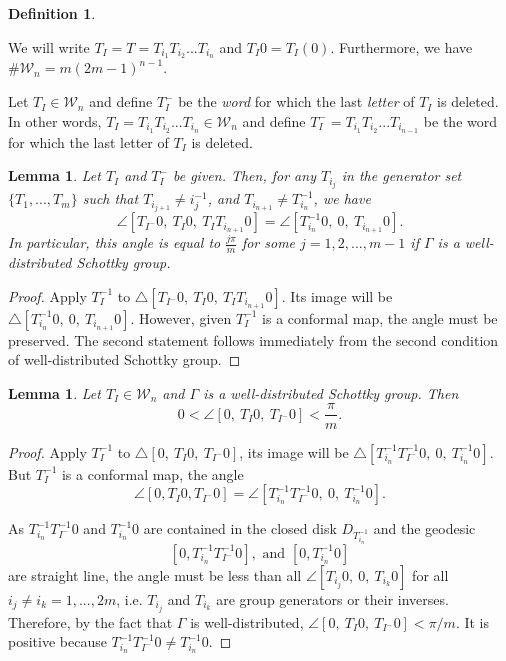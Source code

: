\documentclass[12pt,oneside]{sfsuthesis}
\theoremstyle{plain} %
\newtheorem{lemma}[theorem]{Lemma}
\theoremstyle{definition}  %
\newtheorem{definition}{Definition}[chapter]
\theoremstyle{remark}  %
\theoremstyle{plain}
\begin{document}
{\begin{definition}
\end{definition}



We will write $T_I =  T = T_{i_1}T_{i_2}...T_{i_n}$ and $T_I 0  = T_I(0)$. Furthermore, we have $\#{\mathcal W}_n = m  (2m-1)^{n-1}$.




Let $T_I\in{\mathcal W}_n$ and define $T_I^{-}$  be the \textit{word} for which the last \textit{letter} of $T_I$ is deleted. In other words, $T_I=T_{i_1}T_{i_2}...T_{i_n}\in{\mathcal W}_n$ and define $T_I^{-}=T_{i_1}T_{i_2}...T_{i_{n-1}}$ be the word for which the last letter of $T_I$ is deleted.



\begin{lemma}\label{lemma1}
Let $T_I$ and $T_I^{-}$ be given. Then, for any $T_{i_j}$ in the generator set $\{T_1,...,T_m\}$ such that $T_{i_{j+1}}\ne i_{j}^{-1}$, and $T_{i_{n+1}}\neq T_{i_{n}}^{-1}$, we have
$$
\angle  [T_{I^{-}}0, \ T_I0, \ T_{I}T_{i_{n+1}}0] = \angle [T_{i_{n}}^{-1}0, \ 0, \ T_{i_{n+1}}0]. 
$$
In particular, this angle is equal to $\frac{j\pi}{m}$ for some $j =  1,2,...,m-1$ if $\Gamma$ is a well-distributed Schottky group. 
\end{lemma}

\begin{proof}
Apply $T_{I}^{-1}$ to $\bigtriangleup [T_{I^{-}}0, \ T_I0, \  T_{I}T_{i_{n+1}}0]$. Its image will be $\bigtriangleup [T_{i_{n}}^{-1}0, \ 0, \  T_{i_{n+1}}0]$. However, given $T_{I}^{-1}$ is a conformal map, the angle must be preserved. The second statement follows immediately from the second condition of well-distributed Schottky group. 
\end{proof}

\begin{lemma}\label{lemma2}
Let $T_I\in{\mathcal W}_n$ and $\Gamma$ is a well-distributed Schottky group. Then 
$$ 
0<\angle [0,  \ T_I0,  \ T_{I^{-}}0] <\frac{\pi}{m}.
$$
\end{lemma}

\begin{proof}
Apply $T_{I}^{-1}$ to $\bigtriangleup[0,\ T_I0,   \ T_{I^{-}}0]$, its image will be $\bigtriangleup[ T_{i_n}^{-1} T_{I^{-}}^{-1}0, \  0, \  T_{i_n}^{-1}0]$. But $T_{I}^{-1}$ is a conformal  map, the angle 
$$
\angle [0, T_I0, T_{I^{-}}0]
 = \angle [T_{i_n}^{-1} T_{I^{-}}^{-1}0, \  0, \  T_{i_n}^{-1}0].
$$


As $T_{i_n}^{-1} T_{I^{-}}^{-1}0$ and $T_{i_n}^{-1}0$ are contained in the closed disk $D_{T_{i_n}^{-1}}$ and the geodesic $$[0,T_{i_{n}}^{-1} T_{I^{-}}^{-1}0 ], \text{ and }[0, T_{i_{n}}^{-1}0]$$ 
are straight line, the angle must be less than all $\angle [T_{i_j}0, \ 0, \  T_{i_k}0]$ for all $i_j \ne i_k = 1,...,2m$, i.e. $T_{i_j}$ and $T_{i_k}$ are group generators or their inverses. Therefore, by the fact that $\Gamma$ is well-distributed, $\angle [0, \ T_I0, \ T_{I^{-}}0] <\pi/m$. It is positive because $T_{i_n}^{-1} T_{I^{-}}^{-1}0\ne T_{i_n}^{-1}0$. 
\end{proof}


}
\end{document}
